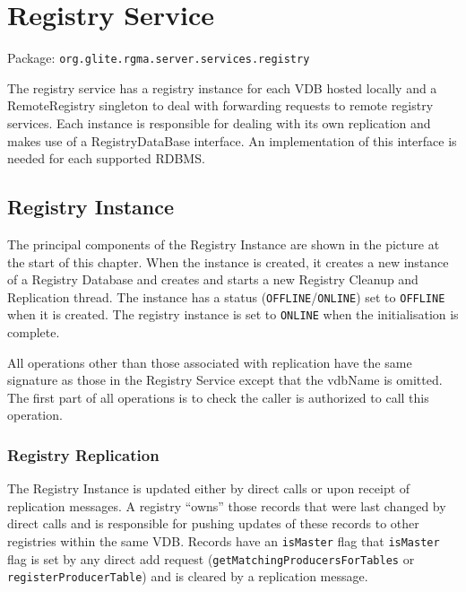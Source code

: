 \section{Registry Service}
\label{sec:registryService}

Package: \texttt{org.glite.rgma.server.services.registry}

The registry service has a registry instance for each VDB hosted
locally and a RemoteRegistry singleton to deal with forwarding
requests to remote registry services. Each instance is responsible for
dealing with its own replication and makes use of a RegistryDataBase
interface. An implementation of this interface is needed for each
supported RDBMS.



\subsection{Registry Instance}
\label{sec:registryInstance}

The principal components of the Registry Instance are shown in the picture at the
start of this chapter. When the instance is created, it creates a new instance of
a Registry Database and creates and starts a new Registry Cleanup and Replication
thread.  The instance has a status (\texttt{OFFLINE}/\texttt{ONLINE}) set to
\texttt{OFFLINE} when it is created. The registry instance is set to
\texttt{ONLINE} when the initialisation is complete.

All operations other than those associated with replication  have the same
signature as those in the Registry Service except that the vdbName is omitted.
The first part of all operations is to check the caller is authorized to call
this operation.

\subsubsection{Registry Replication}
\label{sec:registryReplication}
\label{sec:replicationIntroduction}
The Registry Instance is updated either by direct calls or upon
receipt of replication messages. A registry ``owns'' those records
that were last changed by direct calls and is responsible for pushing
updates of these records to other registries within the same
VDB. Records have an \texttt{isMaster} flag that \texttt{isMaster}
flag is set by any direct add request
(\texttt{getMatchingProducersForTables} or
\texttt{registerProducerTable}) and is cleared by a replication
message.

